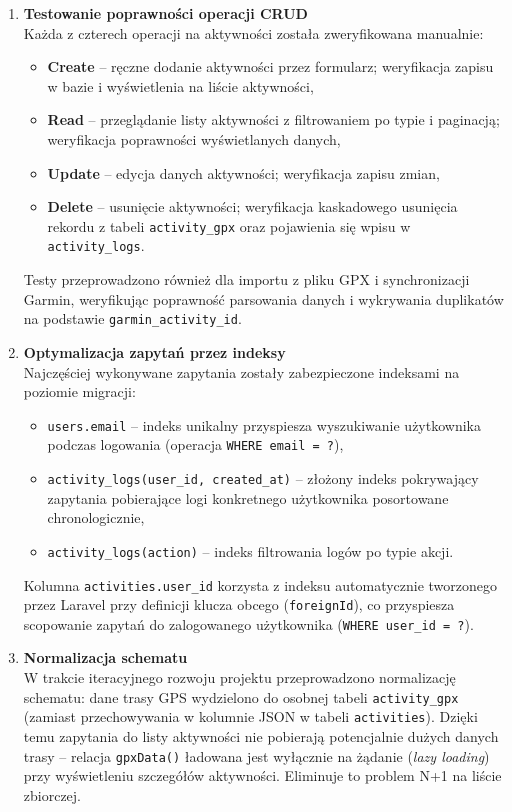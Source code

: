 \documentclass[12pt,a4paper]{report}
\begin{document}
\begin{enumerate}[resume]

\item \textbf{Testowanie poprawności operacji CRUD} \\
Każda z czterech operacji na aktywności została zweryfikowana manualnie:
\begin{itemize}[noitemsep]
    \item \textbf{Create} -- ręczne dodanie aktywności przez formularz; weryfikacja zapisu w bazie i wyświetlenia na liście aktywności,
    \item \textbf{Read} -- przeglądanie listy aktywności z filtrowaniem po typie i paginacją; weryfikacja poprawności wyświetlanych danych,
    \item \textbf{Update} -- edycja danych aktywności; weryfikacja zapisu zmian,
    \item \textbf{Delete} -- usunięcie aktywności; weryfikacja kaskadowego usunięcia rekordu z tabeli \texttt{activity\_gpx} oraz pojawienia się wpisu w \texttt{activity\_logs}.
\end{itemize}
Testy przeprowadzono również dla importu z pliku GPX i synchronizacji Garmin, weryfikując poprawność parsowania danych i wykrywania duplikatów na podstawie \texttt{garmin\_activity\_id}.

\item \textbf{Optymalizacja zapytań przez indeksy} \\
Najczęściej wykonywane zapytania zostały zabezpieczone indeksami na poziomie migracji:
\begin{itemize}[noitemsep]
    \item \texttt{users.email} -- indeks unikalny przyspiesza wyszukiwanie użytkownika podczas logowania (operacja \texttt{WHERE email = ?}),
    \item \texttt{activity\_logs(user\_id, created\_at)} -- złożony indeks pokrywający zapytania pobierające logi konkretnego użytkownika posortowane chronologicznie,
    \item \texttt{activity\_logs(action)} -- indeks filtrowania logów po typie akcji.
\end{itemize}
Kolumna \texttt{activities.user\_id} korzysta z indeksu automatycznie tworzonego przez Laravel przy definicji klucza obcego (\texttt{foreignId}), co przyspiesza scopowanie zapytań do zalogowanego użytkownika (\texttt{WHERE user\_id = ?}).

\item \textbf{Normalizacja schematu} \\
W trakcie iteracyjnego rozwoju projektu przeprowadzono normalizację schematu: dane trasy GPS wydzielono do osobnej tabeli \texttt{activity\_gpx} (zamiast przechowywania w kolumnie JSON w tabeli \texttt{activities}). Dzięki temu zapytania do listy aktywności nie pobierają potencjalnie dużych danych trasy -- relacja \texttt{gpxData()} ładowana jest wyłącznie na żądanie (\textit{lazy loading}) przy wyświetleniu szczegółów aktywności. Eliminuje to problem N+1 na liście zbiorczej.

\end{enumerate}

\end{document}
